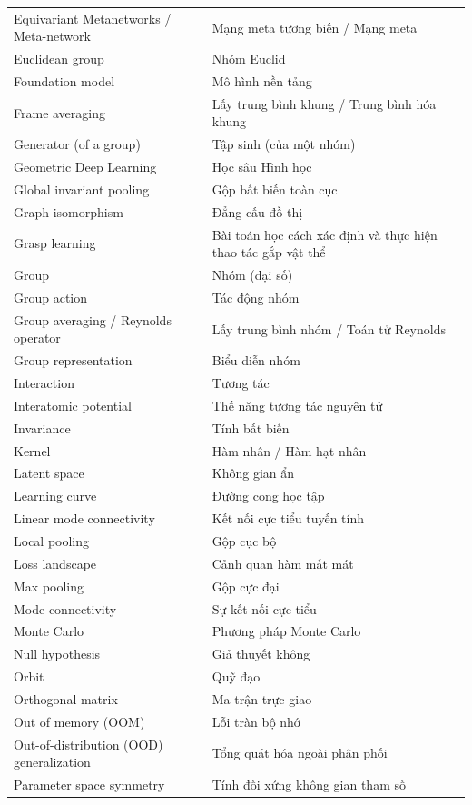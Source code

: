 \documentclass[oneside]{hcmus-report}
\theoremstyle{plain}
\theoremstyle{definition}
\begin{document}
\begin{longtable}{p{} p{}}
Equivariant Metanetworks / Meta-network & Mạng meta tương biến / Mạng meta \\
Euclidean group & Nhóm Euclid \\
Foundation model & Mô hình nền tảng \\
Frame averaging & Lấy trung bình khung / Trung bình hóa khung \\
Generator (of a group) & Tập sinh (của một nhóm) \\
Geometric Deep Learning & Học sâu Hình học \\
Global invariant pooling & Gộp bất biến toàn cục \\
Graph isomorphism & Đẳng cấu đồ thị \\
Grasp learning & Bài toán học cách xác định và thực hiện thao tác gắp vật thể \\
Group & Nhóm (đại số) \\
Group action & Tác động nhóm \\
Group averaging / Reynolds operator & Lấy trung bình nhóm / Toán tử Reynolds \\
Group representation & Biểu diễn nhóm \\
Interaction & Tương tác \\
Interatomic potential & Thế năng tương tác nguyên tử \\
Invariance & Tính bất biến \\
Kernel & Hàm nhân / Hàm hạt nhân \\
Latent space & Không gian ẩn \\
Learning curve & Đường cong học tập \\
Linear mode connectivity & Kết nối cực tiểu tuyến tính \\
Local pooling & Gộp cục bộ \\
Loss landscape & Cảnh quan hàm mất mát \\
Max pooling & Gộp cực đại \\
Mode connectivity & Sự kết nối cực tiểu \\
Monte Carlo & Phương pháp Monte Carlo \\
Null hypothesis & Giả thuyết không \\
Orbit & Quỹ đạo \\
Orthogonal matrix & Ma trận trực giao \\
Out of memory (OOM) & Lỗi tràn bộ nhớ \\
Out-of-distribution (OOD) generalization & Tổng quát hóa ngoài phân phối \\
Parameter space symmetry & Tính đối xứng không gian tham số \\

\end{longtable}
\end{document}
